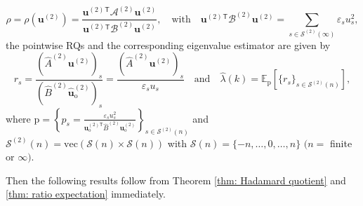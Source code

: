 \documentclass[11pt]{article}
\def\u{\mathbf{u}}
\numberwithin{equation}{section}
\begin{document}
\begin{equation} \label{def: RQ of 2Dto4D}
\rho = \rho(\boldsymbol{u}^{(2)}) =
\frac{ \boldsymbol{u}^{(2)}\!^\mathsf{T} \mathcal{A}^{(2)} \boldsymbol{u}^{(2)} }
{ \boldsymbol{u}^{(2)}\!^\mathsf{T} \mathcal{B}^{(2)} \boldsymbol{u}^{(2)} }, \quad \text{with} \quad
\boldsymbol{u}^{(2)}\!^\mathsf{T} \mathcal{B}^{(2)} \boldsymbol{u}^{(2)} =
\sum_{s\in \mathcal{S}^{(2)}(\infty)} \varepsilon_{s} u_{s}^2,
\end{equation}
the pointwise RQs and the corresponding eigenvalue estimator are given by
\begin{equation} \label{def: statistic r_ij}
r_{s} =
\frac{\left(\widehat{A}^{(2)} \u^{(2)}\right)_{s}}{\left(\widehat{B}^{(2)} \widehat{\u}_{\mathrm{o}}^{(2)}\right)_{s} } = \frac{\left(\widehat{A}^{(2)} \u^{(2)}\right)_{s}}{\varepsilon_{s} u_{s} }
\quad \text{and} \quad
\widehat{\lambda}(k) = \mathbb{E}_\mathrm{p}\left[ \{ r_{s} \}_{s\in \mathcal{S}^{(2)}(n)} \right],
\end{equation}
where $ \mathrm{p} = \left\{ p_{s} =
\frac{\varepsilon_{s} u_{s}^2}{\u_{\mathrm{o}}^{(2)\mathsf{T}} \widehat{B}^{(2)} \u^{(2)}_{\mathrm{o}}}
\right\}_{s\in \mathcal{S}^{(2)}(n)}$ and $\mathcal{S}^{(2)}(n) = \text{vec}(\mathcal{S}(n) \times \mathcal{S}(n))$ with $\mathcal{S}(n) = \{-n, \ldots, 0, \ldots, n\}$ $(n =$ finite or $\infty).$


Then the following results follow from Theorem \ref{thm: Hadamard quotient} and \ref{thm: ratio expectation} immediately.
\end{document}
